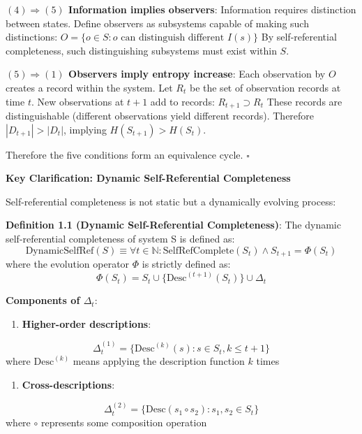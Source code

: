 \textbf{$(4) \Rightarrow (5)$ Information implies observers}:
Information requires distinction between states.
Define observers as subsystems capable of making such distinctions:
$O = \{o \in S: o \text{ can distinguish different } I(s)\}$
By self-referential completeness, such distinguishing subsystems must exist within $S$.

\textbf{$(5) \Rightarrow (1)$ Observers imply entropy increase}:
Each observation by $O$ creates a record within the system.
Let $R_t$ be the set of observation records at time $t$.
New observations at $t+1$ add to records: $R_{t+1} \supset R_t$
These records are distinguishable (different observations yield different records).
Therefore $|D_{t+1}| > |D_t|$, implying $H(S_{t+1}) > H(S_t)$.

Therefore the five conditions form an equivalence cycle. $\square$

\textbf{Key Clarification: Dynamic Self-Referential Completeness}

Self-referential completeness is not static but a dynamically evolving process:

\textbf{Definition 1.1 (Dynamic Self-Referential Completeness)}:
\label{def:1.1}
The dynamic self-referential completeness of system S is defined as:
\begin{equation}
\text{DynamicSelfRef}(S) \equiv \forall t \in \mathbb{N}: \text{SelfRefComplete}(S_t) \land S_{t+1} = \Phi(S_t)
\end{equation}
where the evolution operator $\Phi$ is strictly defined as:
\begin{equation}
\Phi(S_t) = S_t \cup \{\text{Desc}^{(t+1)}(S_t)\} \cup \Delta_t
\end{equation}

\textbf{Components of $\Delta_t$}:
\begin{enumerate}
\item \textbf{Higher-order descriptions}:
\end{enumerate}
  
\begin{equation}
\Delta_t^{(1)} = \{\text{Desc}^{(k)}(s) : s \in S_t, k \leq t+1\}
\end{equation}
  where $\text{Desc}^{(k)}$ means applying the description function $k$ times

\begin{enumerate}
\item \textbf{Cross-descriptions}:
\end{enumerate}
  
\begin{equation}
\Delta_t^{(2)} = \{\text{Desc}(s_1 \circ s_2) : s_1, s_2 \in S_t\}
\end{equation}
  where $\circ$ represents some composition operation

